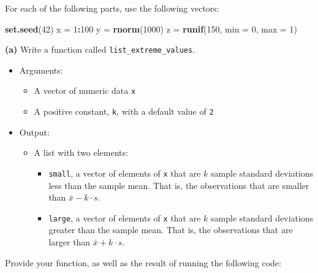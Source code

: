 \documentclass[]{article}
\newenvironment{Shaded}{\begin{snugshade}}{\end{snugshade}}
\newcommand{\DataTypeTok}[1]{\textcolor[rgb]{0.13,0.29,0.53}{#1}}
\newcommand{\DecValTok}[1]{\textcolor[rgb]{0.00,0.00,0.81}{#1}}
\newcommand{\KeywordTok}[1]{\textcolor[rgb]{0.13,0.29,0.53}{\textbf{#1}}}
\newcommand{\NormalTok}[1]{#1}
\newcommand{\OperatorTok}[1]{\textcolor[rgb]{0.81,0.36,0.00}{\textbf{#1}}}
\newcommand{\StringTok}[1]{\textcolor[rgb]{0.31,0.60,0.02}{#1}}
\providecommand{\tightlist}{%
  \setlength{\itemsep}{0pt}\setlength{\parskip}{0pt}}
\begin{document}
For each of the following parts, use the following vectors:

\begin{Shaded}
\begin{Highlighting}[]
\KeywordTok{set.seed}\NormalTok{(}\DecValTok{42}\NormalTok{)}
\NormalTok{x =}\StringTok{ }\DecValTok{1}\OperatorTok{:}\DecValTok{100}
\NormalTok{y =}\StringTok{ }\KeywordTok{rnorm}\NormalTok{(}\DecValTok{1000}\NormalTok{)}
\NormalTok{z =}\StringTok{ }\KeywordTok{runif}\NormalTok{(}\DecValTok{150}\NormalTok{, }\DataTypeTok{min =} \DecValTok{0}\NormalTok{, }\DataTypeTok{max =} \DecValTok{1}\NormalTok{)}
\end{Highlighting}
\end{Shaded}

\textbf{(a)} Write a function called \texttt{list\_extreme\_values}.

\begin{itemize}
\tightlist
\item
  Arguments:

  \begin{itemize}
  \tightlist
  \item
    A vector of numeric data \texttt{x}
  \item
    A positive constant, \texttt{k}, with a default value of \texttt{2}
  \end{itemize}
\item
  Output:

  \begin{itemize}
  \tightlist
  \item
    A list with two elements:

    \begin{itemize}
    \tightlist
    \item
      \texttt{small}, a vector of elements of \texttt{x} that are \(k\)
      sample standard deviations less than the sample mean. That is, the
      observations that are smaller than \(\bar{x} - k \cdot s\).
    \item
      \texttt{large}, a vector of elements of \texttt{x} that are \(k\)
      sample standard deviations greater than the sample mean. That is,
      the observations that are larger than \(\bar{x} + k \cdot s\).
    \end{itemize}
  \end{itemize}
\end{itemize}

Provide your function, as well as the result of running the following
code:
\end{document}

